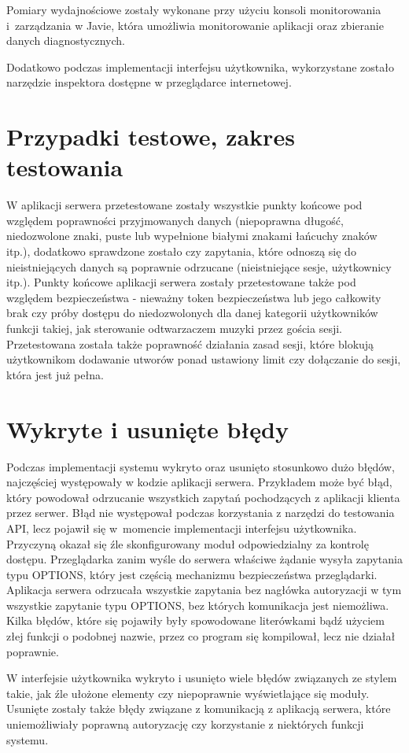 Pomiary wydajnościowe zostały wykonane przy użyciu konsoli monitorowania i~zarządzania w Javie, która umożliwia monitorowanie aplikacji oraz zbieranie danych diagnostycznych. 

Dodatkowo podczas implementacji interfejsu użytkownika, wykorzystane zostało narzędzie inspektora dostępne w przeglądarce internetowej.

\section{Przypadki testowe, zakres testowania}
W aplikacji serwera przetestowane zostały wszystkie punkty końcowe pod względem poprawności przyjmowanych danych (niepoprawna długość, niedozwolone znaki, puste lub wypełnione białymi znakami łańcuchy znaków itp.), dodatkowo sprawdzone zostało czy zapytania, które odnoszą się do nieistniejących danych są poprawnie odrzucane (nieistniejące sesje, użytkownicy itp.). Punkty końcowe aplikacji serwera zostały przetestowane także pod względem bezpieczeństwa - nieważny token bezpieczeństwa lub jego całkowity brak czy próby dostępu do niedozwolonych dla danej kategorii użytkowników funkcji takiej, jak sterowanie odtwarzaczem muzyki przez gościa sesji. Przetestowana została także poprawność działania zasad sesji, które blokują użytkownikom dodawanie utworów ponad ustawiony limit czy dołączanie do sesji, która jest już pełna.

\section{Wykryte i usunięte błędy}
Podczas implementacji systemu wykryto oraz usunięto stosunkowo dużo błędów, najczęściej występowały w kodzie aplikacji serwera. Przykładem może być błąd, który powodował odrzucanie wszystkich zapytań pochodzących z aplikacji klienta przez serwer. Błąd nie występował podczas korzystania z narzędzi do testowania API, lecz pojawił się w~momencie implementacji interfejsu użytkownika. Przyczyną okazał się źle skonfigurowany moduł odpowiedzialny za kontrolę dostępu. Przeglądarka zanim wyśle do serwera właściwe żądanie wysyła zapytania typu OPTIONS, który jest częścią mechanizmu bezpieczeństwa przeglądarki. Aplikacja serwera odrzucała wszystkie zapytania bez nagłówka autoryzacji w tym wszystkie zapytanie typu OPTIONS, bez których komunikacja jest niemożliwa. Kilka błędów, które się pojawiły były spowodowane literówkami bądź użyciem złej funkcji o podobnej nazwie, przez co program się kompilował, lecz nie działał poprawnie.

W interfejsie użytkownika wykryto i usunięto wiele błędów związanych ze stylem takie, jak źle ułożone elementy czy niepoprawnie wyświetlające się moduły. Usunięte zostały także błędy związane z komunikacją z aplikacją serwera, które uniemożliwiały poprawną autoryzację czy korzystanie z niektórych funkcji systemu.

